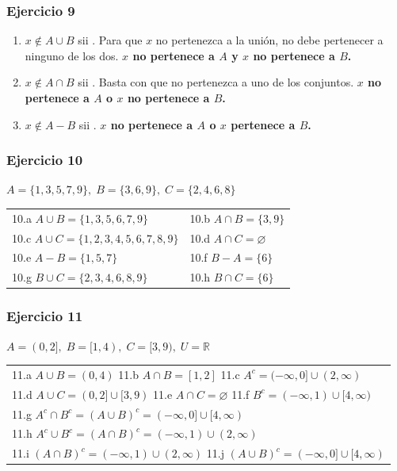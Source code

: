 \documentclass[12pt,a4paper]{article}
\begin{document}
\subsubsection*{\textcolor{accent}{Ejercicio 9}}
\begin{enumerate}[label=9.\alph*]
  \item $x\notin A\cup B$ sii \underline{\hspace{3cm}}. Para que $x$ no pertenezca a la unión, no debe pertenecer a ninguno de los dos. \textbf{$x$ no pertenece a $A$ y $x$ no pertenece a $B$.}
  \item $x\notin A\cap B$ sii \underline{\hspace{3cm}}. Basta con que no pertenezca a uno de los conjuntos. \textbf{$x$ no pertenece a $A$ o $x$ no pertenece a $B$.}
  \item $x\notin A-B$ sii \underline{\hspace{3cm}}. \textbf{$x$ no pertenece a $A$ o $x$ pertenece a $B$.}
\end{enumerate}

\subsubsection*{\textcolor{accent}{Ejercicio 10}}
$A=\{1,3,5,7,9\},\; B=\{3,6,9\},\; C=\{2,4,6,8\}$
\begin{center}\small
\begin{tabular}{ll}
10.a $A\cup B=\{1,3,5,6,7,9\}$ & 10.b $A\cap B=\{3,9\}$ \\
10.c $A\cup C=\{1,2,3,4,5,6,7,8,9\}$ & 10.d $A\cap C=\varnothing$ \\
10.e $A-B=\{1,5,7\}$ & 10.f $B-A=\{6\}$ \\
10.g $B\cup C=\{2,3,4,6,8,9\}$ & 10.h $B\cap C=\{6\}$ \\
\end{tabular}
\end{center}

\subsubsection*{\textcolor{accent}{Ejercicio 11}}
$A=(0,2],\; B=[1,4),\; C=[3,9),\; U=\mathbb{R}$
\begin{center}\small
\begin{tabular}{l}
11.a $A\cup B=(0,4)$ \quad 11.b $A\cap B=[1,2]$ \quad 11.c $A^c=(-\infty,0]\cup(2,\infty)$ \\
11.d $A\cup C=(0,2]\cup[3,9)$ \quad 11.e $A\cap C=\varnothing$ \quad 11.f $B^c=(-\infty,1)\cup[4,\infty)$ \\
11.g $A^c\cap B^c=(A\cup B)^c=(-\infty,0]\cup[4,\infty)$ \\
11.h $A^c\cup B^c=(A\cap B)^c=(-\infty,1)\cup(2,\infty)$ \\
11.i $(A\cap B)^c=(-\infty,1)\cup(2,\infty)$ \quad 11.j $(A\cup B)^c=(-\infty,0]\cup[4,\infty)$ \\
\end{tabular}
\end{center}
\end{document}
